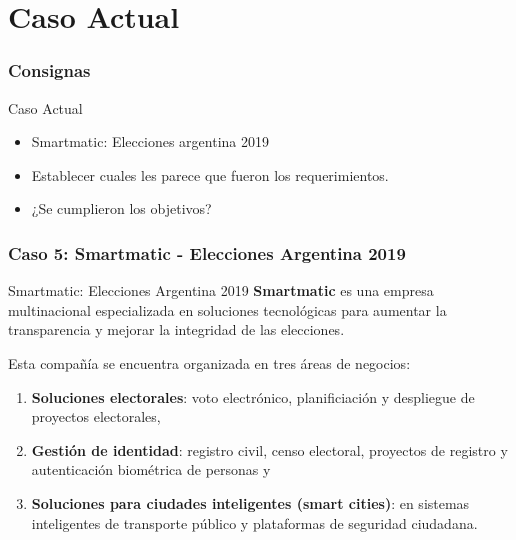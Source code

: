 \documentclass[11pt]{beamer}
\begin{document}
    \section{Caso Actual}
    
    \begin{frame}
    	\frametitle{Consignas}
    	\begin{exampleblock}{Caso Actual}
    		\begin{itemize}
    			\item Smartmatic: Elecciones argentina 2019
    			\item Establecer cuales les parece que fueron los requerimientos.
    			\item ¿Se cumplieron los objetivos?
    		\end{itemize}
    	\end{exampleblock}
    \end{frame}

    \begin{frame}
    	\frametitle{Caso 5: Smartmatic - Elecciones Argentina 2019}
    	\begin{block}{Smartmatic: Elecciones Argentina 2019}
    		\textbf{Smartmatic} es una empresa multinacional especializada en soluciones tecnológicas para aumentar la transparencia y mejorar la integridad de las elecciones.
    	\end{block}
    
        \pause
        
        Esta compañía se encuentra organizada en tres áreas de negocios:
        
        \pause
        
        \begin{enumerate}
        	\item \textbf{Soluciones electorales}: voto electrónico, planificiación y despliegue de proyectos electorales,
        	\pause
        	\item \textbf{Gestión de identidad}: registro civil, censo electoral, proyectos de registro y autenticación biométrica de personas y
        	\pause
        	\item \textbf{Soluciones para ciudades inteligentes (smart cities)}: en sistemas inteligentes de transporte público y plataformas de seguridad ciudadana.
        \end{enumerate}
    \end{frame}
\end{document}
